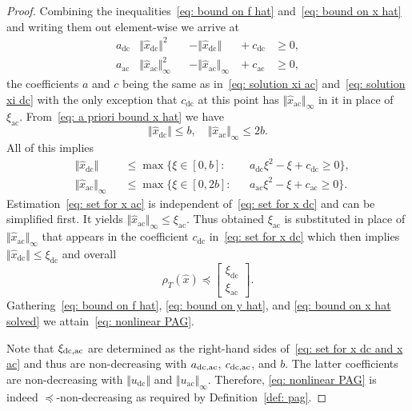 \documentclass[letterpaper, 10 pt, conference]{ieeeconf}
\newcommand{\ac}{_\mathrm{ac}}
\newcommand{\dc}{_\mathrm{dc}}
\newcommand{\set}[1]{\lbrace #1 \rbrace}
\newcommand{\norm}[1]{\Vert #1 \Vert}
\begin{document}
\begin{proof}
    Combining the inequalities~\eqref{eq: bound on f hat} and~\eqref{eq: bound on x hat} and writing them out element-wise we arrive at
    \begin{subequations}
        \begin{alignat}{4}
            a\dc &\norm{\hat x\dc}^2 &&- \norm{\hat x\dc} &{}+ c\dc &\geq 0, \\
            a\ac &\norm{\hat x\ac}_\infty^2 &&- \norm{\hat x\ac}_\infty &{}+ c\ac &\geq 0,
        \end{alignat}
    \end{subequations}
    the coefficients $a$ and $c$ being the same as in~\eqref{eq: solution xi ac} and~\eqref{eq: solution xi dc} with the only exception that $c\dc$ at this point has $\norm{\hat x\ac}_\infty$ in it in place of $\xi\ac$.
    From~\eqref{eq: a priori bound x hat} we have
    \begin{equation}
        \norm{\hat x\dc} \leq b, \quad
        \norm{\hat x\ac}_\infty \leq 2b.
    \end{equation}
    All of this implies
    \begin{subequations}
        \label{eq: set for x dc and x ac}
        \begin{alignat}{3}
            \label{eq: set for x dc}
            &\norm{\hat x\dc} &&\leq \max\set{\xi \in [0,b] \colon
            &&a\dc \xi^2 - \xi + c\dc \geq 0}, \\
            \label{eq: set for x ac}
            &\norm{\hat x\ac}_\infty &&\leq \max\set{\xi \in [0,2b] \colon
            &&a\ac \xi^2 - \xi + c\ac \geq 0}.
        \end{alignat}
    \end{subequations}
    Estimation~\eqref{eq: set for x ac} is independent of~\eqref{eq: set for x dc} and can be simplified first. It yields $\norm{\hat x\ac}_\infty \leq \xi\ac$. Thus obtained $\xi\ac$ is substituted in place of $\norm{\hat x\ac}_\infty$ that appears in the coefficient $c\dc$ in~\eqref{eq: set for x dc} which then implies $\norm{\hat x\dc} \leq \xi\dc$ and overall
    \begin{equation}
        \label{eq: bound on x hat solved}
        \rho_T(\hat x) \preceq
        \begin{bmatrix}
            \xi\dc \\ \xi\ac
        \end{bmatrix}.
    \end{equation}
    Gathering~\eqref{eq: bound on f hat}, \eqref{eq: bound on y hat}, and \eqref{eq: bound on x hat solved} we attain~\eqref{eq: nonlinear PAG}.
    
    Note that $\xi_{\rm dc, ac}$ are determined as the right-hand sides of~\eqref{eq: set for x dc and x ac} and thus are non-decreasing with $a_{\rm dc, ac}$, $c_{\rm dc, ac}$, and $b$. The latter coefficients are non-decreasing with $\norm{u\dc}$ and $\norm{u\ac}_\infty$. Therefore, \eqref{eq: nonlinear PAG} is indeed $\preceq$-non-decreasing as required by Definition~\ref{def: pag}.
\end{proof}
\end{document}
